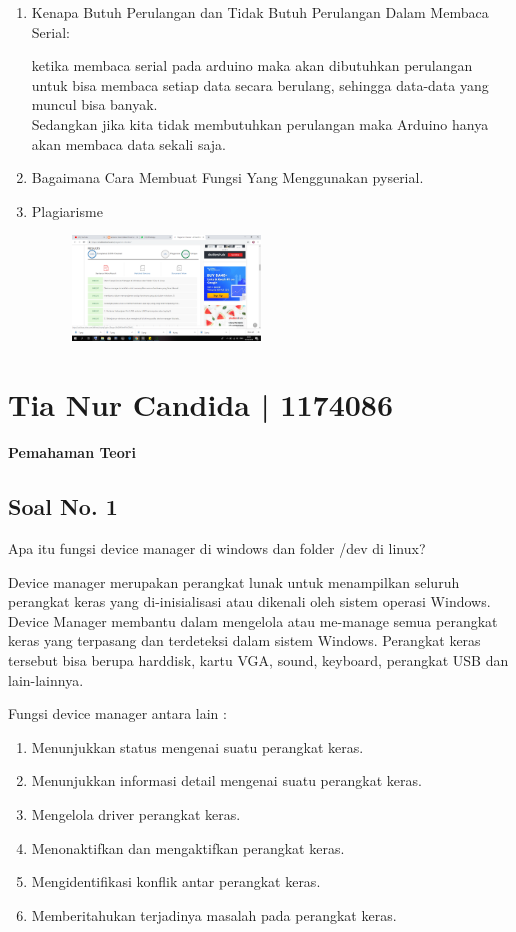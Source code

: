 \begin{enumerate}
\item Kenapa Butuh Perulangan dan Tidak Butuh Perulangan Dalam Membaca Serial:

ketika membaca serial pada arduino maka akan dibutuhkan perulangan untuk bisa membaca setiap data secara berulang, sehingga data-data yang muncul bisa banyak. \\
Sedangkan jika kita tidak membutuhkan perulangan maka Arduino hanya akan membaca data sekali saja. 

\item Bagaimana Cara Membuat Fungsi Yang Menggunakan pyserial.

\item Plagiarisme
	\begin{figure}[ht!]
	\includegraphics[width=5cm]{figures/5/1174062/8.png}
	\centering
	\end{figure}

\end{enumerate}


\section{Tia Nur Candida | 1174086}
{\Large \textbf{Pemahaman Teori}}
\subsection{Soal No. 1}
Apa itu fungsi device manager di windows dan folder /dev di linux?

\hfill \break
Device manager merupakan perangkat lunak untuk menampilkan seluruh perangkat keras yang di-inisialisasi atau dikenali oleh sistem operasi Windows. Device Manager membantu dalam mengelola atau me-manage semua perangkat keras yang terpasang dan terdeteksi dalam sistem Windows. Perangkat keras tersebut bisa berupa harddisk, kartu VGA, sound, keyboard, perangkat USB dan lain-lainnya.

\hfill \break
Fungsi device manager antara lain :
\begin{enumerate}
	\item Menunjukkan status mengenai suatu perangkat keras.
	\item Menunjukkan informasi detail mengenai suatu perangkat keras.
	\item Mengelola driver perangkat keras.
	\item Menonaktifkan dan mengaktifkan perangkat keras.
	\item Mengidentifikasi konflik antar perangkat keras.
	\item Memberitahukan terjadinya masalah pada perangkat keras.
\end{enumerate}

